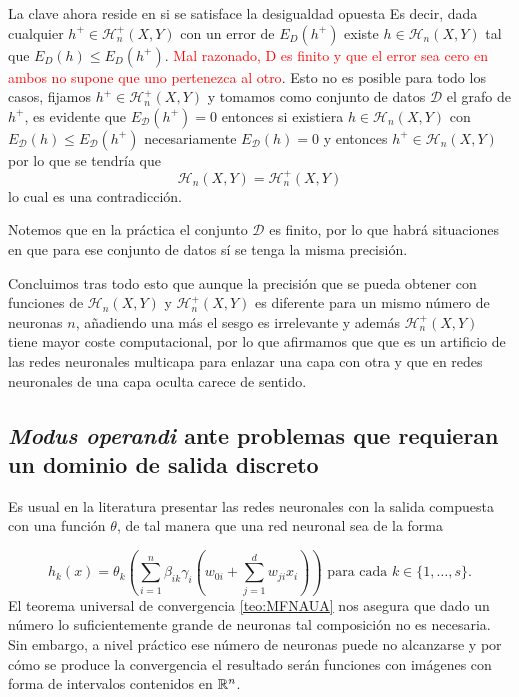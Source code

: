  La clave ahora reside en si se satisface la desigualdad opuesta
Es decir, dada cualquier $h^+ \in \mathcal{H}^+_n(X,Y)$ con un error de $E_D(h^+)$ existe $h \in \mathcal{H}_n(X,Y)$  tal que $E_D(h) \leq E_D(h^+).$  
\textcolor{red}{Mal razonado, D es finito y que el error sea cero en ambos no supone que uno pertenezca al otro}.
Esto no es posible para todo los casos, fijamos $h^+ \in \mathcal{H}^+_n(X,Y)$ y tomamos como conjunto de datos $\mathcal{D}$ el grafo de $h^+$, es evidente que $E_{\mathcal{D}}(h^+) = 0$ entonces si existiera $h \in \mathcal{H}_n(X,Y)$ con $E_{\mathcal{D}}(h) \leq E_{\mathcal{D}}(h^+)$ necesariamente $E_{\mathcal{D}}(h) = 0$ y entonces $h^+ \in \mathcal{H}_n(X,Y)$ por lo que se tendría que 
$$\mathcal{H}_n(X,Y) = \mathcal{H}_n^+(X,Y)$$ 
lo cual es una contradicción.

Notemos que en la práctica el conjunto $\mathcal{D}$ es finito, 
por lo que habrá situaciones en que para ese conjunto de datos sí  se tenga la misma precisión. 


 Concluimos tras todo esto que aunque la precisión que se pueda obtener con funciones de $\mathcal{H}_n(X,Y)$ y $\mathcal{H}^+_n(X,Y)$ es diferente para un mismo número de neuronas $n$, añadiendo una más el sesgo es irrelevante  y además $\mathcal{H}^+_n(X,Y)$ tiene mayor coste computacional, por lo que afirmamos que 
que es un artificio de las redes neuronales multicapa para enlazar una capa con otra y que en redes neuronales de una capa oculta carece de sentido.

\subsection{\textit{Modus operandi} ante problemas que requieran un dominio de salida discreto}

Es usual en la literatura presentar las redes neuronales con la salida compuesta con una función $\theta$, de tal manera que una red neuronal sea de la forma

\begin{equation}\label{red-neuronal-con-compuesta}
    h_k(x) = \theta_k 
    \left(
        \sum_{i=1}^{n} \beta_{i k} \gamma_{i}
    \left(
        w_{0 i} + \sum_{j=1}^d w_{j i } x_i
    \right) 
    \right)
    \text{ para cada  } k \in \{1, \ldots, s \}.
\end{equation}
El teorema universal de convergencia \ref{teo:MFNAUA} nos asegura 
que dado un número lo suficientemente grande de neuronas tal 
composición no es necesaria. Sin embargo, a nivel práctico ese 
número de neuronas puede no alcanzarse y por cómo se produce la convergencia el resultado serán funciones con imágenes con forma de intervalos contenidos en $\mathbb{R}^n$.

